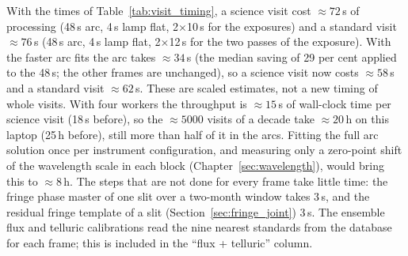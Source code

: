 With the times of Table~\ref{tab:visit_timing}, a science visit cost $\approx72$\,s of processing (48\,s arc,
4\,s lamp flat, 2$\times$10\,s for the exposures) and a standard visit $\approx76$\,s (48\,s arc, 4\,s lamp flat,
2$\times$12\,s for the two passes of the exposure). With the faster arc fits the arc takes $\approx34$\,s (the
median saving of 29 per cent applied to the 48\,s; the other frames are unchanged), so a science visit now costs
$\approx58$\,s and a standard visit $\approx62$\,s. These are scaled estimates, not a new timing of whole visits.
With four workers the throughput is $\approx15$\,s of wall-clock time per science visit (18\,s before), so the
$\approx5000$ visits of a decade take $\approx20$\,h on this laptop (25\,h before), still more than half of it in
the arcs.
Fitting the full arc solution once per instrument configuration, and measuring only a zero-point shift of the
wavelength scale in each block (Chapter~\ref{sec:wavelength}), would bring this to $\approx8$\,h. The steps that are
not done for every frame take little time: the fringe phase master of one slit over a two-month window takes 3\,s,
and the residual fringe template of a slit (Section~\ref{sec:fringe_joint}) 3\,s. The ensemble flux and telluric
calibrations read the nine nearest standards from the database for each frame; this is included in the
``flux + telluric'' column.
